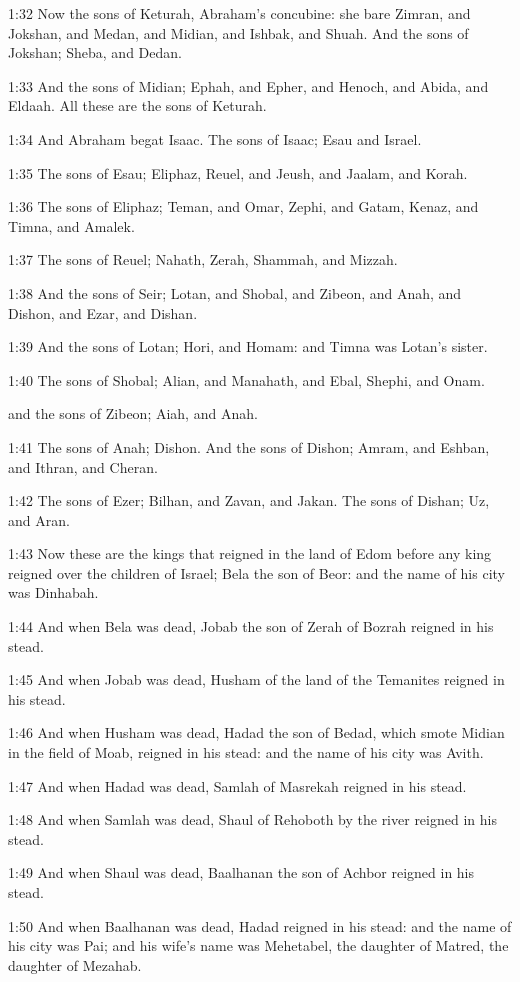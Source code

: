1:32 Now the sons of Keturah, Abraham's concubine: she bare Zimran,
and Jokshan, and Medan, and Midian, and Ishbak, and Shuah. And the
sons of Jokshan; Sheba, and Dedan.

1:33 And the sons of Midian; Ephah, and Epher, and Henoch, and Abida,
and Eldaah. All these are the sons of Keturah.

1:34 And Abraham begat Isaac. The sons of Isaac; Esau and Israel.

1:35 The sons of Esau; Eliphaz, Reuel, and Jeush, and Jaalam, and
Korah.

1:36 The sons of Eliphaz; Teman, and Omar, Zephi, and Gatam, Kenaz,
and Timna, and Amalek.

1:37 The sons of Reuel; Nahath, Zerah, Shammah, and Mizzah.

1:38 And the sons of Seir; Lotan, and Shobal, and Zibeon, and Anah,
and Dishon, and Ezar, and Dishan.

1:39 And the sons of Lotan; Hori, and Homam: and Timna was Lotan's
sister.

1:40 The sons of Shobal; Alian, and Manahath, and Ebal, Shephi, and
Onam.

and the sons of Zibeon; Aiah, and Anah.

1:41 The sons of Anah; Dishon. And the sons of Dishon; Amram, and
Eshban, and Ithran, and Cheran.

1:42 The sons of Ezer; Bilhan, and Zavan, and Jakan. The sons of
Dishan; Uz, and Aran.

1:43 Now these are the kings that reigned in the land of Edom before
any king reigned over the children of Israel; Bela the son of Beor:
and the name of his city was Dinhabah.

1:44 And when Bela was dead, Jobab the son of Zerah of Bozrah reigned
in his stead.

1:45 And when Jobab was dead, Husham of the land of the Temanites
reigned in his stead.

1:46 And when Husham was dead, Hadad the son of Bedad, which smote
Midian in the field of Moab, reigned in his stead: and the name of his
city was Avith.

1:47 And when Hadad was dead, Samlah of Masrekah reigned in his stead.

1:48 And when Samlah was dead, Shaul of Rehoboth by the river reigned
in his stead.

1:49 And when Shaul was dead, Baalhanan the son of Achbor reigned in
his stead.

1:50 And when Baalhanan was dead, Hadad reigned in his stead: and the
name of his city was Pai; and his wife's name was Mehetabel, the
daughter of Matred, the daughter of Mezahab.

